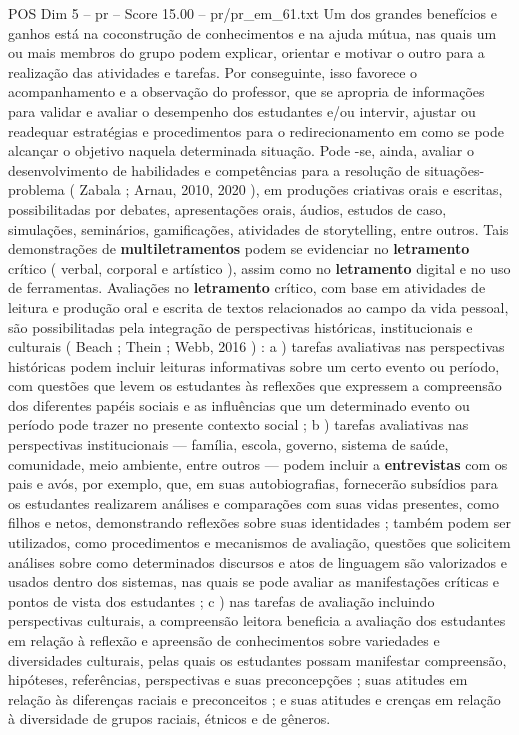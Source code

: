 \begin{textsample}{POS Dim 5 – pr – Score 15.00 – pr/pr\_em\_61.txt}
Um dos grandes benefícios e ganhos está na coconstrução de conhecimentos e na ajuda mútua, nas quais um ou mais membros do grupo podem explicar, orientar e motivar o outro para a realização das atividades e tarefas.
Por conseguinte, isso favorece o acompanhamento e a observação do professor, que se apropria de informações para validar e avaliar o desempenho dos estudantes e/ou intervir, ajustar ou readequar estratégias e procedimentos para o redirecionamento em como se pode alcançar o objetivo naquela determinada situação.
Pode -se, ainda, avaliar o desenvolvimento de habilidades e competências para a resolução de situações-problema ( Zabala ; Arnau, 2010, 2020 ), em produções criativas orais e escritas, possibilitadas por debates, apresentações orais, áudios, estudos de caso, simulações, seminários, gamificações, atividades de storytelling, entre outros.
Tais demonstrações de \textbf{multiletramentos} podem se evidenciar no \textbf{letramento} crítico ( verbal, corporal e artístico ), assim como no \textbf{letramento} digital e no uso de ferramentas.
Avaliações no \textbf{letramento} crítico, com base em atividades de leitura e produção oral e escrita de textos relacionados ao campo da vida pessoal, são possibilitadas pela integração de perspectivas históricas, institucionais e culturais ( Beach ; Thein ; Webb, 2016 ) : a ) tarefas avaliativas nas perspectivas históricas podem incluir leituras informativas sobre um certo evento ou período, com questões que levem os estudantes às reflexões que expressem a compreensão dos diferentes papéis sociais e as influências que um determinado evento ou período pode trazer no presente contexto social ; b ) tarefas avaliativas nas perspectivas institucionais — família, escola, governo, sistema de saúde, comunidade, meio ambiente, entre outros — podem incluir a \textbf{entrevistas} com os pais e avós, por exemplo, que, em suas autobiografias, fornecerão subsídios para os estudantes realizarem análises e comparações com suas vidas presentes, como filhos e netos, demonstrando reflexões sobre suas identidades ; também podem ser utilizados, como procedimentos e mecanismos de avaliação, questões que solicitem análises sobre como determinados discursos e atos de linguagem são valorizados e usados dentro dos sistemas, nas quais se pode avaliar as manifestações críticas e pontos de vista dos estudantes ; c ) nas tarefas de avaliação incluindo perspectivas culturais, a compreensão leitora beneficia a avaliação dos estudantes em relação à reflexão e apreensão de conhecimentos sobre variedades e diversidades culturais, pelas quais os estudantes possam manifestar compreensão, hipóteses, referências, perspectivas e suas preconcepções ; suas atitudes em relação às diferenças raciais e preconceitos ; e suas atitudes e crenças em relação à diversidade de grupos raciais, étnicos e de gêneros.

\end{textsample}
